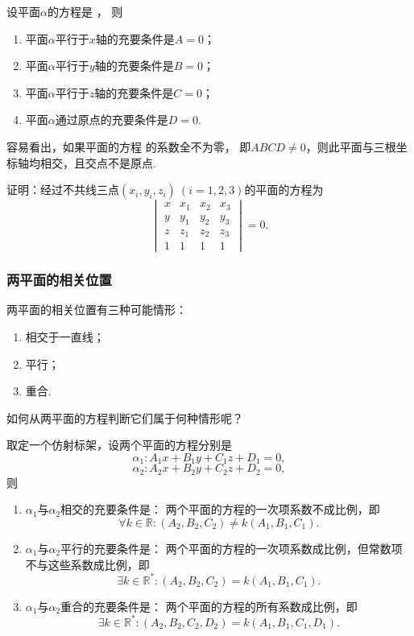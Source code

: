 \begin{corollary}
设平面\(\alpha\)的方程是 ，
则\begin{enumerate}
	\item 平面\(\alpha\)平行于\(x\)轴的充要条件是\(A=0\)；
	\item 平面\(\alpha\)平行于\(y\)轴的充要条件是\(B=0\)；
	\item 平面\(\alpha\)平行于\(z\)轴的充要条件是\(C=0\)；
	\item 平面\(\alpha\)通过原点的充要条件是\(D=0\).
\end{enumerate}
\end{corollary}

容易看出，如果平面的方程  的系数全不为零，
即\(ABCD\neq0\)，则此平面与三根坐标轴均相交，且交点不是原点.

\begin{example}
证明：经过不共线三点\((x_i,y_i,z_i)\ (i=1,2,3)\)的平面的方程为\[
	\begin{vmatrix}
		x & x_1 & x_2 & x_3 \\
		y & y_1 & y_2 & y_3 \\
		z & z_1 & z_2 & z_3 \\
		1 & 1 & 1 & 1
	\end{vmatrix} = 0.
\]
\end{example}

\subsubsection{两平面的相关位置}
两平面的相关位置有三种可能情形：
\begin{enumerate}
	\item 相交于一直线；
	\item 平行；
	\item 重合.
\end{enumerate}
如何从两平面的方程判断它们属于何种情形呢？

\begin{theorem}
取定一个仿射标架，设两个平面的方程分别是\[
	\alpha_1: A_1 x + B_1 y + C_1 z + D_1 = 0,
\]\[
	\alpha_2: A_2 x + B_2 y + C_2 z + D_2 = 0,
\]
则\begin{enumerate}
	\item \(\alpha_1\)与\(\alpha_2\)相交的充要条件是：
	两个平面的方程的一次项系数不成比例，即\[
		\forall k \in \mathbb{R}:
		(A_2,B_2,C_2) \neq k (A_1,B_1,C_1).
	\]
	\item \(\alpha_1\)与\(\alpha_2\)平行的充要条件是：
	两个平面的方程的一次项系数成比例，但常数项不与这些系数成比例，即\[
		\exists k \in \mathbb{R}^*:
		(A_2,B_2,C_2) = k (A_1,B_1,C_1).
	\]
	\item \(\alpha_1\)与\(\alpha_2\)重合的充要条件是：
	两个平面的方程的所有系数成比例，即\[
		\exists k \in \mathbb{R}^*:
		(A_2,B_2,C_2,D_2) = k (A_1,B_1,C_1,D_1).
	\]
\end{enumerate}
\end{theorem}

